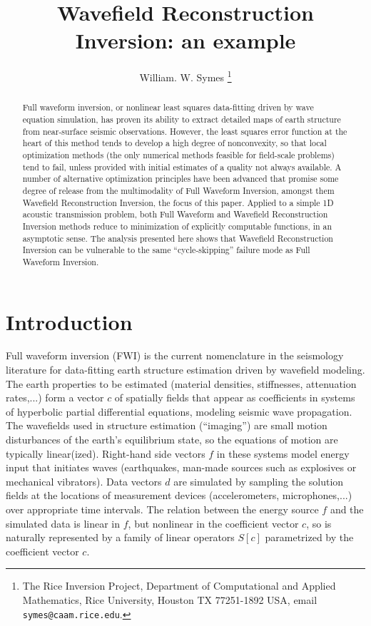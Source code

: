 \title{Wavefield Reconstruction Inversion: an example}
\author{William. W. Symes \thanks{The Rice Inversion Project,
Department of Computational and Applied Mathematics, Rice University,
Houston TX 77251-1892 USA, email {\tt symes@caam.rice.edu}.}}



\begin{abstract}
  Full waveform inversion, or nonlinear least squares data-fitting
  driven by wave equation simulation, has proven its ability to
  extract detailed maps of earth structure from near-surface seismic
  observations. However, the least squares error function at the heart
  of this method tends to develop a high degree of nonconvexity, so
  that local optimization methods (the only numerical methods feasible
  for field-scale problems) tend to fail, unless provided with initial
  estimates of a quality not always available. A number of alternative
  optimization principles have been advanced that promise some degree
  of release from the multimodality of Full Waveform Inversion,
  amongst them Wavefield Reconstruction Inversion, the focus of this
  paper. Applied to a simple 1D acoustic transmission problem, both
  Full Waveform and Wavefield Reconstruction Inversion methods reduce
  to minimization of explicitly computable functions, in an asymptotic
  sense. The analysis presented here shows that Wavefield
  Reconstruction Inversion can be vulnerable to the same
  ``cycle-skipping'' failure mode as Full Waveform Inversion.
\end{abstract}

\section{Introduction}

Full waveform inversion (FWI) is the current nomenclature in the
seismology literature for data-fitting earth structure estimation
driven by wavefield modeling. The earth properties to be estimated
(material densities, stiffnesses, attenuation rates,...) form a vector
$c$ of spatially fields that appear as coefficients in systems of hyperbolic
partial differential equations, modeling seismic wave
propagation. The wavefields used in structure estimation (``imaging'')
are small motion disturbances of the earth's equilibrium state, so the
equations of motion are typically 
linear(ized). Right-hand side vectors $f$ in these systems model energy
input that initiates waves (earthquakes, man-made sources such as
explosives or mechanical vibrators). Data vectors $d$ are simulated by
sampling the solution fields at the locations of measurement devices
(accelerometers, microphones,...)  over appropriate time
intervals. The relation between the energy source $f$ and the
simulated data is linear in $f$, but nonlinear in the coefficient
vector $c$, so is naturally represented by a family of linear
operators $S[c]$ parametrized by the coefficient vector $c$.

